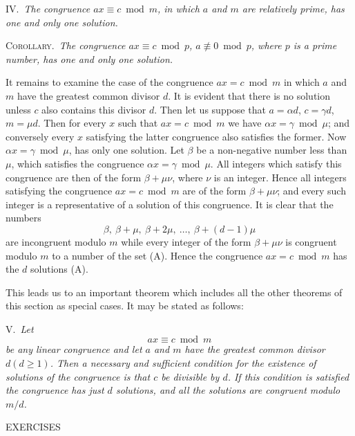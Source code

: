 \documentclass[oneside]{book}
\begin{document}
\smallskip IV.~\emph{The congruence $ax \equiv c \bmod m$, in which
$a$ and $m$ are relatively prime, has one and only one solution.}


\smallskip\textsc{Corollary.}~\emph{The congruence
$ax \equiv c \bmod p$, $a \not\equiv 0 \bmod p$, where $p$ is a
prime number, has one and only one solution.}

It remains to examine the case of the congruence $ax =c \bmod m$ in
which $a$ and $m$ have the greatest common divisor $d$. It is
evident that there is no solution unless $c$ also contains this
divisor $d$. Then let us suppose that $a = \alpha d$, $c = \gamma
d$, $m = \mu d$. Then for every $x$ such that $ax = c \bmod m$ we
have $\alpha x = \gamma \bmod \mu$; and conversely every $x$
satisfying the latter congruence also satisfies the former. Now
$\alpha x = \gamma \bmod \mu$, has only one solution. Let $\beta$ be
a non-negative number less than $\mu$, which satisfies the
congruence $\alpha x = \gamma \bmod \mu$. All integers which satisfy
this congruence are then of the form $\beta + \mu\nu$, where $\nu$
is an integer. Hence all integers satisfying the congruence $ax = c
\bmod m$ are of the form $\beta + \mu\nu$; and every such integer is
a representative of a solution of this congruence. It is clear that
the numbers
\begin{equation}
\beta,\ \beta + \mu,\ \beta + 2\mu,\ \ldots,\ \beta + (d-1)\mu
\tag{A}
\end{equation}
are incongruent modulo $m$ while every integer of the form $\beta +
\mu\nu$ is congruent modulo $m$ to a number of the set (A). Hence
the congruence $ax = c \bmod m$ has the $d$ solutions (A).

This leads us to an important theorem which includes all the other
theorems of this section as special cases. It may be stated as
follows:

\smallskip V.~\emph{Let}
\begin{equation*}
ax \equiv c \bmod m
\end{equation*}
\emph{be any linear congruence and let $a$ and $m$ have the greatest
common divisor $d (d \geq 1)$. Then a necessary and sufficient
condition for the existence of solutions of the congruence is that
$c$ be divisible by $d$. If this condition is satisfied the
congruence has just $d$ solutions, and all the solutions are
congruent modulo $m / d$.}

\newpage
\begin{center}
EXERCISES
\end{center}
\end{document}
